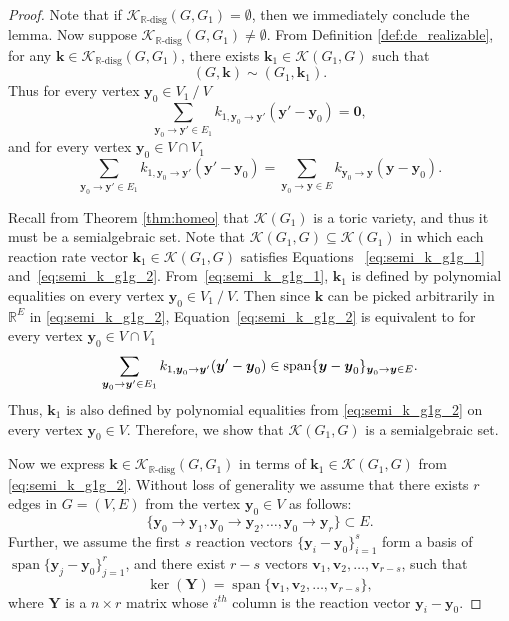 \documentclass[11pt]{article}
\theoremstyle{plain}
\theoremstyle{definition}
\theoremstyle{remark}
\newcommand\RR{\mathbb{R}}
\newcommand\by{\boldsymbol{y}}
\newcommand\bk{\boldsymbol{k}}
\newcommand\bv{\boldsymbol{v}}
\newcommand\bY{\boldsymbol{Y}}
\newcommand{\mK}{\mathcal{K}}
\newcommand{\dK}{\mathcal{K}_{\RR\text{-disg}}}
\DeclareMathOperator{\spn}{span}
\begin{document}
\begin{proof}
Note that if $\dK(G, G_1) = \emptyset$, then we immediately conclude the lemma. Now suppose $\dK(G, G_1) \neq \emptyset$.
From Definition \ref{def:de_realizable}, for any $\bk \in \dK (G, G_1)$, there exists $\bk_1 \in \mK (G_1, G)$ such that
\[
(G, \bk) \sim (G_1, \bk_1).
\]
Thus for every vertex $\by_0 \in V_1 \ / \ V$
\begin{equation} \label{eq:semi_k_g1g_1}
\sum_{\by_0 \to \by' \in E_1} k_{1, \by_0  \to \by'}  (\by' - \by_0) = \mathbf{0},
\end{equation}
and for every vertex $\by_0 \in V \cap V_1$
\begin{equation} \label{eq:semi_k_g1g_2}
 \sum_{\by_0 \to \by' \in E_1} k_{1, \by_0  \to \by'}  (\by' - \by_0)
= \sum_{\by_0 \to \by \in E} k_{\by_0  \to \by} (\by - \by_0).
\end{equation}

Recall from Theorem \ref{thm:homeo} that $\mK (G_1)$ is a toric variety, and thus it must be a semialgebraic set.
Note that $\mK (G_1, G) \subseteq \mK (G_1)$ in which each reaction rate vector $\bk_1\in \mK (G_1, G)$ satisfies Equations ~\eqref{eq:semi_k_g1g_1} and~\eqref{eq:semi_k_g1g_2}. 
From~\eqref{eq:semi_k_g1g_1}, $\bk_1$ is defined by polynomial equalities on every vertex $\by_0 \in V_1 \ / \ V$. Then since $\bk$ can be picked arbitrarily in $\RR^E$ in \eqref{eq:semi_k_g1g_2}, Equation~\eqref{eq:semi_k_g1g_2} is equivalent to for every vertex $\by_0 \in V \cap V_1$
\begin{equation} \notag
\sum_{\by_0 \to \by' \in E_1} k_{1, \by_0  \to \by'}  (\by' - \by_0) \in \spn \{ \by - \by_0 \}_{\by_0 \to \by \in E}.
\end{equation}
Thus, $\bk_1$ is also defined by polynomial equalities from \eqref{eq:semi_k_g1g_2} on every vertex $\by_0 \in V$. 
Therefore, we show that $\mK (G_1, G)$ is a semialgebraic set.

Now we express $\bk \in \dK (G, G_1)$ in terms of $\bk_1 \in \mK (G_1, G)$ from \eqref{eq:semi_k_g1g_2}. Without loss of generality we assume that there exists $r$ edges in $G = (V, E)$ from the vertex $\by_0 \in V$ as follows:
\[
\{ \by_0 \to \by_1, \by_0 \to \by_2, \ldots, \by_0 \to \by_r \} \subset E.
\]
Further, we assume the first $s$ reaction vectors $\{ \by_i - \by_0 \}^{s}_{i=1}$ form a basis of $\spn \{ \by_j - \by_0 \}^r_{j=1}$, and there exist $r-s$ vectors
$\bv_1, \bv_2, \ldots, \bv_{r-s}$, such that
\begin{equation}
\ker (\bY) = \spn \{ \bv_1, \bv_2, \ldots, \bv_{r-s} \},
\end{equation}
where $\bY$ is a $n \times r$ matrix whose $i^{th}$ column is the reaction vector $\by_i - \by_0$.


\end{proof}
\end{document}
